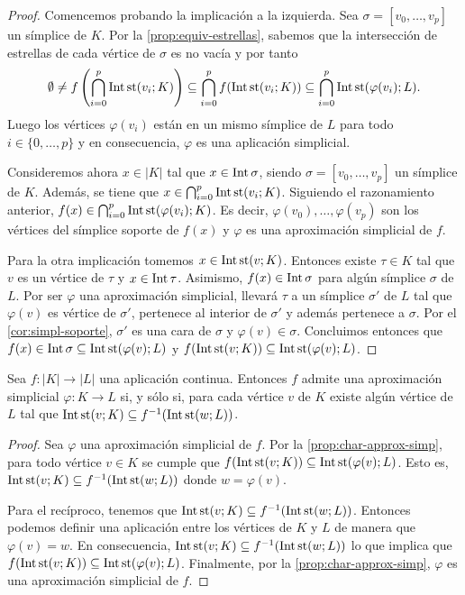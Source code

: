 \begin{proof}
	Comencemos probando la implicación a la izquierda. Sea $\sigma = [v_0, \dots, v_p]$ un símplice de $K$. Por la \autoref{prop:equiv-estrellas}, sabemos que la intersección de estrellas de cada vértice de $\sigma$ es no vacía y por tanto
	\[
		\emptyset \neq f \left( \bigcap_{i=0}^p\operatorname{Int} \operatorname{st} (v_i;K) \right) \subseteq \bigcap_{i=0}^p f(\operatorname{Int} \operatorname{st} (v_i;K)) \subseteq \bigcap_{i=0}^p \operatorname{Int} \operatorname{st} (\varphi(v_i);L).
	\]
	Luego los vértices $\varphi(v_i)$ están en un mismo símplice de $L$ para todo $i \in \{0,\dots,p\}$ y en consecuencia, $\varphi$ es una aplicación simplicial.

	Consideremos ahora $x \in |K|$ tal que $x \in \operatorname{Int} \sigma$, siendo $\sigma = [v_0, \dots, v_p]$ un símplice de $K$. Además, se tiene que $x \in \bigcap_{i=0}^p\operatorname{Int} \operatorname{st} (v_i;K)$. Siguiendo el razonamiento anterior, $f(x) \in \bigcap_{i=0}^p\operatorname{Int} \operatorname{st} (\varphi(v_i);K)$. Es decir, $\varphi(v_0), \dots, \varphi(v_p)$ son los vértices del símplice soporte de $f(x)$ y $\varphi$ es una aproximación simplicial de $f$.

	Para la otra implicación tomemos $x \in \operatorname{Int} \operatorname{st} (v;K)$. Entonces existe $\tau \in K$ tal que $v$ es un vértice de $\tau$ y $x \in \operatorname{Int} \tau$. Asimismo, $f(x) \in \operatorname{Int} \sigma$ para algún símplice $\sigma$ de $L$. Por ser $\varphi$ una aproximación simplicial, llevará $\tau$ a un símplice $\sigma'$ de $L$ tal que $\varphi(v)$ es vértice de $\sigma'$, pertenece al interior de $\sigma'$ y además pertenece a $\sigma$. Por el \autoref{cor:simpl-soporte}, $\sigma'$ es una cara de $\sigma$ y $\varphi(v) \in \sigma$. Concluimos entonces que $f(x) \in \operatorname{Int} \sigma \subseteq \operatorname{Int} \operatorname{st}(\varphi(v);L)$ y $f(\operatorname{Int} \operatorname{st}(v;K)) \subseteq \operatorname{Int} \operatorname{st}(\varphi(v);L)$.
\end{proof}
\begin{corolario}
	\label{cor:char-approx-simp}
	Sea $f: |K| \to |L|$ una aplicación continua. Entonces $f$ admite una aproximación simplicial $\varphi : K \to L$ si, y sólo si, para cada vértice $v$ de $K$ existe algún vértice de $L$ tal que $\operatorname{Int} \operatorname{st}(v;K) \subseteq f^{-1}(\operatorname{Int} \operatorname{st}(w;L))$.
\end{corolario}
\begin{proof}
	Sea $\varphi$ una aproximación simplicial de $f$. Por la \autoref{prop:char-approx-simp}, para todo vértice $v \in K$ se cumple que $f(\operatorname{Int} \operatorname{st}(v;K)) \subseteq \operatorname{Int} \operatorname{st}(\varphi(v);L)$. Esto es, $\operatorname{Int} \operatorname{st}(v;K) \subseteq f^{-1}(\operatorname{Int} \operatorname{st}(w;L))$ donde $w = \varphi(v)$.

	Para el recíproco, tenemos que $\operatorname{Int} \operatorname{st}(v;K) \subseteq f^{-1}(\operatorname{Int} \operatorname{st}(w;L))$. Entonces podemos definir una aplicación entre los vértices de $K$ y $L$ de manera que $\varphi(v) = w$. En consecuencia, $\operatorname{Int} \operatorname{st}(v;K) \subseteq f^{-1}(\operatorname{Int} \operatorname{st}(w;L))$ lo que implica que $f(\operatorname{Int} \operatorname{st}(v;K)) \subseteq \operatorname{Int} \operatorname{st}(\varphi(v);L)$. Finalmente, por la \autoref{prop:char-approx-simp}, $\varphi$ es una aproximación simplicial de $f$.
\end{proof}

